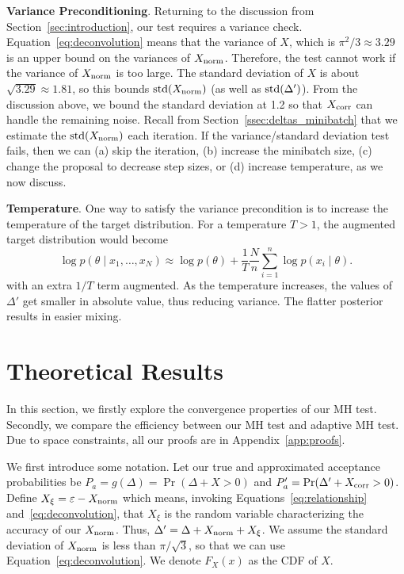 \documentclass{article}
\begin{document}
\textbf{Variance Preconditioning}. Returning to the discussion from Section~\ref{sec:introduction},
our test requires a variance check. Equation~\ref{eq:deconvolution} means that the variance of $X$,
which is $\pi^2/3\approx 3.29$ is an upper bound on the variances of $X_{\rm norm}$. Therefore, the
test cannot work if the variance of $X_{\rm norm}$ is too large. The standard deviation of $X$
is about $\sqrt{3.29}\approx 1.81$, so this bounds ${\rm std}(X_{\rm norm})$ (as well as ${\rm
std}(\Delta')$). From the discussion above, we bound the standard deviation at 1.2 so that $X_{\rm
corr}$ can handle the remaining noise. Recall from Section~\ref{ssec:deltas_minibatch} that we
estimate the ${\rm std}(X_{\rm norm})$ each iteration. If the variance/standard deviation test
fails, then we can (a) skip the iteration, (b) increase the minibatch size, (c) change the proposal
to decrease step sizes, or (d) increase temperature, as we now discuss.

\textbf{Temperature}. One way to satisfy the variance precondition is to increase the temperature of
the target distribution. For a temperature $T>1$, the augmented target distribution would become
\begin{equation}\label{eq:log_temperature}
\log p(\theta \mid x_1,\ldots,x_N) \approx \log p(\theta) + \frac{1}{T}\frac{N}{n} \sum_{i=1}^n\log p(x_i \mid \theta).
\end{equation}
with an extra $1/T$ term augmented. As the temperature increases, the values of $\Delta'$ get
smaller in absolute value, thus reducing variance. The flatter posterior results in easier mixing.




\section{Theoretical Results}\label{sec:theory}

In this section, we firstly explore the convergence properties of our MH test. Secondly, we compare the efficiency between our MH test and adaptive MH test. Due to space constraints, all
our proofs are in Appendix~\ref{app:proofs}.

We first introduce some notation. Let our true and approximated acceptance probabilities be $P_a =
g(\Delta) = \Pr(\Delta + X > 0)$ and $P_a' = \Pr(\Delta' + X_{\rm corr} > 0)$.  Define $X_{\xi} =
\varepsilon - X_{\rm norm}$ which means, invoking Equations~\ref{eq:relationship}
and~\ref{eq:deconvolution}, that $X_\xi$ is the random variable characterizing the accuracy of our
$X_{\rm norm}$.  Thus, $\Delta' = \Delta + X_{\rm norm} + X_\xi$. We assume the standard deviation
of $X_{\rm norm}$ is less than $\pi/\sqrt{3}$, so that we can use Equation~\ref{eq:deconvolution}.
We denote $F_X(x)$ as the CDF of $X$.
\end{document}
